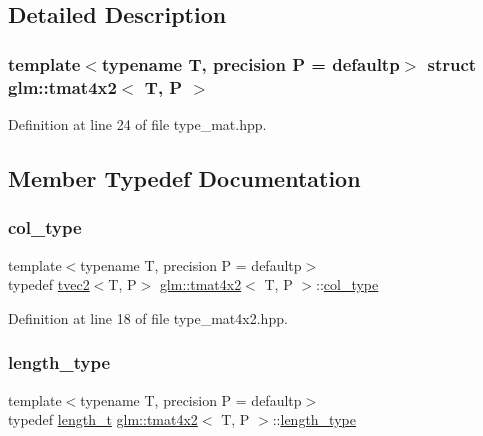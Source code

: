 \subsection{Detailed Description}
\subsubsection*{template$<$typename T, precision P = defaultp$>$\newline
struct glm\+::tmat4x2$<$ T, P $>$}



Definition at line 24 of file type\+\_\+mat.\+hpp.



\subsection{Member Typedef Documentation}
\mbox{\label{structglm_1_1tmat4x2_ac775231a890f4ea29cd0073670309b3a}} 
\subsubsection{\texorpdfstring{col\_type}{col\_type}}
{\footnotesize\ttfamily template$<$typename T, precision P = defaultp$>$ \\
typedef \mbox{\hyperlink{structglm_1_1tvec2}{tvec2}}$<$T, P$>$ \mbox{\hyperlink{structglm_1_1tmat4x2}{glm\+::tmat4x2}}$<$ T, P $>$\+::\mbox{\hyperlink{structglm_1_1tmat4x2_ac775231a890f4ea29cd0073670309b3a}{col\+\_\+type}}}



Definition at line 18 of file type\+\_\+mat4x2.\+hpp.

\mbox{\label{structglm_1_1tmat4x2_a28aaf36ee36edef6715c1fae6874f530}} 
\subsubsection{\texorpdfstring{length\_type}{length\_type}}
{\footnotesize\ttfamily template$<$typename T, precision P = defaultp$>$ \\
typedef \mbox{\hyperlink{namespaceglm_a090a0de2260835bee80e71a702492ed9}{length\+\_\+t}} \mbox{\hyperlink{structglm_1_1tmat4x2}{glm\+::tmat4x2}}$<$ T, P $>$\+::\mbox{\hyperlink{structglm_1_1tmat4x2_a28aaf36ee36edef6715c1fae6874f530}{length\+\_\+type}}}



